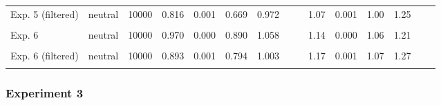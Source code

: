 \documentclass[
]{article}
\begin{document}
\begin{table}[!h]
{\begin{tabular}[t]{llrrrrrrlrrrrrl}
\hspace{1em}Exp. 5 (filtered) & neutral & 10000 & 0.816 & 0.001 & 0.669 & 0.972 &  &  & 1.07 & 0.001 & 1.00 & 1.25 &  & \\
\hspace{1em}\cellcolor{gray!10}{Exp. 5 (filtered)} & \cellcolor{gray!10}{vivid} & \cellcolor{gray!10}{10000} & \cellcolor{gray!10}{1.131} & \cellcolor{gray!10}{0.001} & \cellcolor{gray!10}{0.888} & \cellcolor{gray!10}{1.440} & \cellcolor{gray!10}{4.05} & \cellcolor{gray!10}{<0.001} & \cellcolor{gray!10}{1.49} & \cellcolor{gray!10}{0.003} & \cellcolor{gray!10}{1.11} & \cellcolor{gray!10}{2.26} & \cellcolor{gray!10}{5.20} & \cellcolor{gray!10}{<0.001}\\
\hspace{1em}Exp. 6 & neutral & 10000 & 0.970 & 0.000 & 0.890 & 1.058 &  &  & 1.14 & 0.000 & 1.06 & 1.21 &  & \\
\hspace{1em}\cellcolor{gray!10}{Exp. 6} & \cellcolor{gray!10}{vivid} & \cellcolor{gray!10}{10000} & \cellcolor{gray!10}{1.185} & \cellcolor{gray!10}{0.001} & \cellcolor{gray!10}{1.073} & \cellcolor{gray!10}{1.302} & \cellcolor{gray!10}{5.07} & \cellcolor{gray!10}{<0.001} & \cellcolor{gray!10}{1.35} & \cellcolor{gray!10}{0.002} & \cellcolor{gray!10}{1.21} & \cellcolor{gray!10}{1.73} & \cellcolor{gray!10}{5.86} & \cellcolor{gray!10}{<0.001}\\
\hspace{1em}Exp. 6 (filtered) & neutral & 10000 & 0.893 & 0.001 & 0.794 & 1.003 &  &  & 1.17 & 0.001 & 1.07 & 1.27 &  & \\
\hspace{1em}\cellcolor{gray!10}{Exp. 6 (filtered)} & \cellcolor{gray!10}{vivid} & \cellcolor{gray!10}{10000} & \cellcolor{gray!10}{1.227} & \cellcolor{gray!10}{0.001} & \cellcolor{gray!10}{1.069} & \cellcolor{gray!10}{1.415} & \cellcolor{gray!10}{6.21} & \cellcolor{gray!10}{<0.001} & \cellcolor{gray!10}{1.83} & \cellcolor{gray!10}{0.001} & \cellcolor{gray!10}{1.64} & \cellcolor{gray!10}{2.31} & \cellcolor{gray!10}{13.28} & \cellcolor{gray!10}{<0.001}\\
\bottomrule
\end{tabular}}
\end{table}

\clearpage

\subsubsection{Experiment 3}\label{experiment-3}
\end{document}
